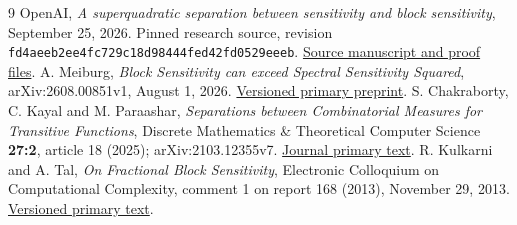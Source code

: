 \documentclass[11pt]{article}
\theoremstyle{definition}
\begin{document}
\begin{thebibliography}{9}
OpenAI, \emph{A superquadratic separation between sensitivity and block sensitivity}, September 25, 2026. Pinned research source, revision
\texttt{fd4aeeb2ee4fc729c18d98444fed42fd0529eeeb}.
\href{https://github.com/openai/math/tree/fd4aeeb2ee4fc729c18d98444fed42fd0529eeeb/preprints/A-superquadratic-separation-between-sensitivity-and-block-sensitivity-September-25-2026}{Source manuscript and proof files}.
A. Meiburg, \emph{Block Sensitivity can exceed Spectral Sensitivity Squared}, arXiv:2608.00851v1, August 1, 2026.
\href{https://arxiv.org/abs/2608.00851v1}{Versioned primary preprint}.
S. Chakraborty, C. Kayal and M. Paraashar, \emph{Separations between Combinatorial Measures for Transitive Functions}, Discrete Mathematics \& Theoretical Computer Science \textbf{27:2}, article 18 (2025); arXiv:2103.12355v7.
\href{https://dmtcs.episciences.org/15992/pdf}{Journal primary text}.
R. Kulkarni and A. Tal, \emph{On Fractional Block Sensitivity}, Electronic Colloquium on Computational Complexity, comment 1 on report 168 (2013), November 29, 2013.
\href{https://eccc.weizmann.ac.il/report/2013/168/comment/1/download/}{Versioned primary text}.
\end{thebibliography}
\end{document}
